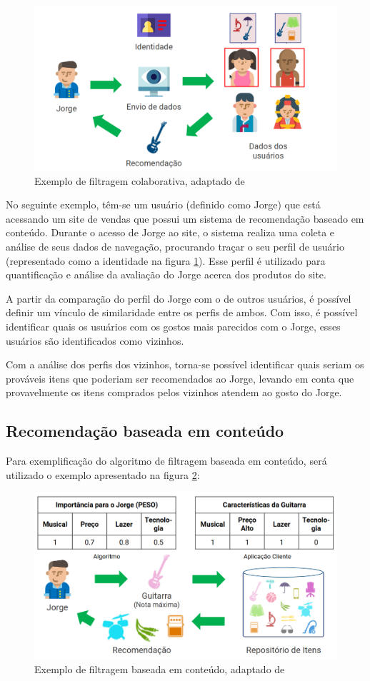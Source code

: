 \begin{figure}[H]
	\centering
	\includegraphics[width=0.7\linewidth]{imagens/colaborativa.png}
	\caption[Exemplo de filtragem colaborativa]{Exemplo de filtragem colaborativa, adaptado de \cite{araujo2011apprecommender}}
    \label{fig:algoritmocolaborativo}
\end{figure}

No seguinte exemplo, têm-se um usuário (definido como Jorge) que está acessando um site de vendas que possui um sistema de recomendação baseado em conteúdo. Durante o acesso de Jorge ao site, o sistema realiza uma coleta e análise de seus dados de navegação, procurando traçar o seu perfil de usuário (representado como a identidade na figura \ref{fig:algoritmocolaborativo}). Esse perfil é utilizado para quantificação e análise da avaliação do Jorge acerca dos produtos do site.

A partir da comparação do perfil do Jorge com o de outros usuários, é possível definir um vínculo de similaridade entre os perfis de ambos. Com isso, é possível identificar quais os usuários com os gostos mais parecidos com o Jorge, esses usuários são identificados como vizinhos.

Com a análise dos perfis dos vizinhos, torna-se possível identificar quais seriam os prováveis itens que poderiam ser recomendados ao Jorge, levando em conta que provavelmente os itens comprados pelos vizinhos atendem ao gosto do Jorge. 

\subsection{Recomendação baseada em conteúdo}

Para exemplificação do algoritmo de filtragem baseada em conteúdo, será utilizado o exemplo apresentado na figura \ref{fig:algoritmoconteudo}:

\begin{figure}[H]
	\centering
	\includegraphics[width=0.7\linewidth]{imagens/baseadoconteudo.png}
	\caption[Exemplo de filtragem baseada em conteúdo]{Exemplo de filtragem baseada em conteúdo, adaptado de \cite{araujo2011apprecommender}}
    \label{fig:algoritmoconteudo}
\end{figure}

